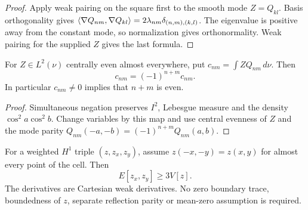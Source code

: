\begin{proof}
\leanok
Apply weak pairing on the square first to the smooth mode $Z=Q_{kl}$.
Basis orthogonality gives
$\langle \nabla Q_{nm},\nabla Q_{kl}\rangle
 =2\lambda_{nm}\delta_{(n,m),(k,l)}$.
The eigenvalue is positive away from the constant mode, so normalization
gives orthonormality. Weak pairing for the supplied $Z$ gives the last formula.
\end{proof}

\begin{lemma}
\label{lem:zonal-coefficient-parity}
\leanok
For $Z\in L^2(\nu)$ centrally even almost everywhere, put
$c_{nm}=\int ZQ_{nm}\,d\nu$. Then
\[
 c_{nm}=(-1)^{n+m}c_{nm}.
\]
In particular $c_{nm}\ne0$ implies that $n+m$ is even.
\end{lemma}

\begin{proof}
\leanok
Simultaneous negation preserves $I^2$, Lebesgue measure and the density
$\cos^2a\cos^2b$. Change variables by this map and use central evenness
of $Z$ and the mode parity
$Q_{nm}(-a,-b)=(-1)^{n+m}Q_{nm}(a,b)$.
\end{proof}

\begin{lemma}
\label{lem:zonal-poincare}
\leanok
For a weighted $H^1$ triple $(z,z_x,z_y)$, assume
$z(-x,-y)=z(x,y)$ for almost every point of the cell. Then
\[
 E[z_x,z_y]\ge3V[z].
\]
The derivatives are Cartesian weak derivatives. No zero boundary trace,
boundedness of $z$, separate reflection parity or mean-zero assumption
is required.
\end{lemma}

